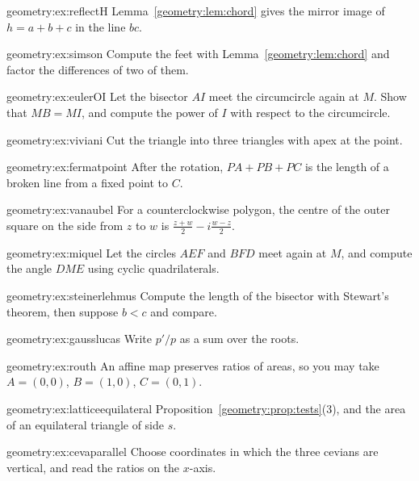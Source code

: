 \begin{hint}{geometry:ex:reflectH}
Lemma~\ref{geometry:lem:chord} gives the mirror image of $h=a+b+c$ in the line $bc$.
\end{hint}
\begin{hint}{geometry:ex:simson}
Compute the feet with Lemma~\ref{geometry:lem:chord} and factor the differences of two of them.
\end{hint}
\begin{hint}{geometry:ex:eulerOI}
Let the bisector $AI$ meet the circumcircle again at $M$. Show that $MB=MI$, and compute the power of $I$ with respect to the circumcircle.
\end{hint}
\begin{hint}{geometry:ex:viviani}
Cut the triangle into three triangles with apex at the point.
\end{hint}
\begin{hint}{geometry:ex:fermatpoint}
After the rotation, $PA+PB+PC$ is the length of a broken line from a fixed point to $C$.
\end{hint}
\begin{hint}{geometry:ex:vanaubel}
For a counterclockwise polygon, the centre of the outer square on the side from $z$ to $w$ is $\frac{z+w}2-i\frac{w-z}2$.
\end{hint}
\begin{hint}{geometry:ex:miquel}
Let the circles $AEF$ and $BFD$ meet again at $M$, and compute the angle $DME$ using cyclic quadrilaterals.
\end{hint}
\begin{hint}{geometry:ex:steinerlehmus}
Compute the length of the bisector with Stewart's theorem, then suppose $b<c$ and compare.
\end{hint}
\begin{hint}{geometry:ex:gausslucas}
Write $p'/p$ as a sum over the roots.
\end{hint}
\begin{hint}{geometry:ex:routh}
An affine map preserves ratios of areas, so you may take $A=(0,0)$, $B=(1,0)$, $C=(0,1)$.
\end{hint}
\begin{hint}{geometry:ex:latticeequilateral}
Proposition~\ref{geometry:prop:tests}(3), and the area of an equilateral triangle of side $s$.
\end{hint}
\begin{hint}{geometry:ex:cevaparallel}
Choose coordinates in which the three cevians are vertical, and read the ratios on the $x$-axis.
\end{hint}

